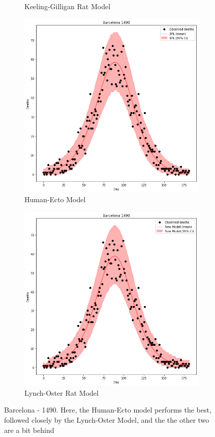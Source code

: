 \documentclass [letterpaper, 12pt] {article}
\begin{document}
\begin{figure}[H]
\begin{subfigure}{0.48\textwidth}
	\caption{Keeling-Gilligan Rat Model}
	\end{subfigure}
	\begin{subfigure}{0.48\textwidth}
	\includegraphics[width=\linewidth]{hum_ecto_barcelona.png}
	\caption{Human-Ecto Model}
	\end{subfigure}\hspace{\fill}
	\begin{subfigure}{0.48\textwidth}
	\includegraphics[width=\linewidth]{rats2_lynch_oster_barcelona.png}
	\caption{Lynch-Oster Rat Model}
	\end{subfigure}
	\caption{Barcelona - 1490. Here, the Human-Ecto model performs the best, followed closely by the Lynch-Oster Model, and the the other two are a bit behind}
\end{figure}
\end{document}
